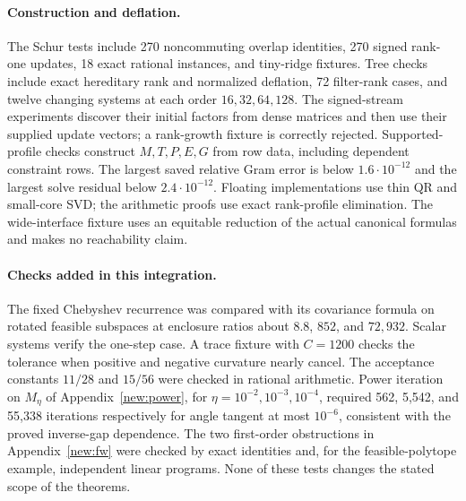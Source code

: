 \documentclass[11pt]{amsart}
\theoremstyle{definition}\newtheorem{definition}[theorem]{Definition}
\theoremstyle{remark}\newtheorem{remark}[theorem]{Remark}
\numberwithin{equation}{section}
\begin{document}
\paragraph{Construction and deflation.}
The Schur tests include 270 noncommuting overlap identities, 270 signed
rank-one updates, 18 exact rational instances, and tiny-ridge fixtures.
Tree checks include exact hereditary rank and normalized deflation,
72 filter-rank cases, and twelve changing systems at each order
$16,32,64,128$. The signed-stream experiments discover their initial
factors from dense matrices and then use their supplied update vectors;
a rank-growth fixture is correctly rejected. Supported-profile checks
construct $M,T,P,E,G$ from row data, including dependent constraint rows.
The largest saved relative Gram error is below $1.6\cdot10^{-12}$ and the
largest solve residual below $2.4\cdot10^{-12}$. Floating implementations
use thin QR and small-core SVD; the arithmetic proofs use exact rank-profile
elimination. The wide-interface fixture uses an equitable reduction of
the actual canonical formulas and makes no reachability claim.

\paragraph{Checks added in this integration.}
The fixed Chebyshev recurrence was compared with its covariance formula
on rotated feasible subspaces at enclosure ratios about $8.8$, $852$,
and $72,932$. Scalar systems verify the one-step case. A trace fixture
with $C=1200$ checks the tolerance when positive and negative curvature
nearly cancel. The acceptance constants $11/28$ and $15/56$ were checked
in rational arithmetic. Power iteration on $M_\eta$ of
Appendix~\ref{new:power}, for $\eta=10^{-2},10^{-3},10^{-4}$, required
562, 5,542, and 55,338 iterations respectively for angle tangent at most
$10^{-6}$, consistent with the proved inverse-gap dependence. The two
first-order obstructions in Appendix~\ref{new:fw} were checked by exact
identities and, for the feasible-polytope example, independent linear
programs. None of these tests changes the stated scope of the theorems.
\end{document}
